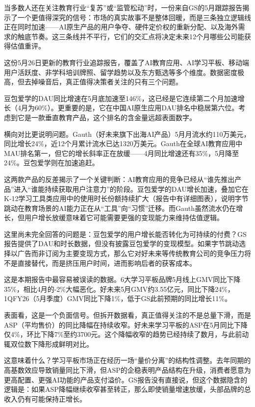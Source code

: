 \documentclass[11pt]{ctexart}
\begin{document}
当多数人还在关注教育行业“复苏”或“监管松动”时，一份来自GS的5月跟踪报告揭示了一个更值得深究的信号：市场的真实故事不是整体回暖，而是三条独立逻辑线正在同时加速——AI原生产品的用户争夺、硬件定价权的重新分配、以及海外需求的触底节奏。这三条线并不平行，它们的交汇点将决定未来12个月哪些公司能获得估值重评。

这份5月26日更新的教育行业追踪报告，覆盖了AI教育应用、AI学习平板、移动端用户活跃度、非学科培训牌照、留学趋势以及东方甄选等多个维度。数据密度极高，但去掉噪音后，真正值得决策者关注的只有三个问题。

豆包爱学的DAU同比增速在5月底加速至146\%，这已经是它连续第二个月加速增长（4月为60\%）。更重要的是，它在中国AI原生应用DAU排名中稳居第六位。考虑到它是一款垂直教育产品，这个排名的含金量远超表面数字。

横向对比更说明问题。Gauth（好未来旗下出海AI产品）5月月流水约110万美元，同比增长24\%，近12个月累计流水已达1320万美元。Gauth在全球AI教育应用中MAU排名第一，但它的增长斜率正在放缓——4月同比增速还有35\%，5月降至24\%。豆包爱学则在加速追赶。

这两款产品的反差揭示了一个关键判断：AI教育应用的竞争已经从“谁先推出产品”进入“谁能持续获取用户注意力”的阶段。豆包爱学的DAU增长加速，叠加它在K-12学习工具类应用中的使用时长份额持续扩大（报告中有详细图表），说明字节跳动在教育场景的AI能力正在从“工具”向“习惯”迁移。而Gauth虽然流水仍在增长，但用户增长放缓意味着它可能需要更强的变现能力来维持估值逻辑。

这里尚未完全回答的问题是：豆包爱学的用户增长能否转化为可持续的付费？GS报告提供了DAU和时长数据，但没有披露豆包爱学的变现模型。如果字节跳动选择以广告而非订阅为主要变现方式，那么它对好未来等传统教育公司的竞争压力将不是直接替代，而是挤压用户时间，进而影响后者的获客成本。

这是本期报告中最容易被误读的数据。6大学习平板品牌5月线上GMV同比下降35\%，相比4月的-2\%大幅恶化。好未来5月GMV约3.55亿元，同比下降24\%，1QFY26（5月季度）GMV同比下降1\%，低于GS此前预期的同比增长11\%。

表面看，这是一个负面信号。但拆开数据看，真正值得关注的不是总量下滑，而是ASP（平均售价）的同比降幅在持续收窄。好未来学习平板的ASP在5月同比下降仅4\%，环比下降7\%至约3700元。这个降幅收窄的趋势已经持续了数月，与此前动辄双位数下降形成鲜明对比。

这意味着什么？学习平板市场正在经历一场“量价分离”的结构性调整。去年同期的高基数效应导致销量同比下滑，但ASP的企稳表明产品结构在升级，消费者愿意为更高配置、更强AI功能的产品支付溢价。GS报告没有直接说，但这个数据隐含的逻辑是：如果ASP降幅继续收窄甚至转正，那么即使销量增速放缓，头部品牌的总收入仍有可能保持正增长。
\end{document}
